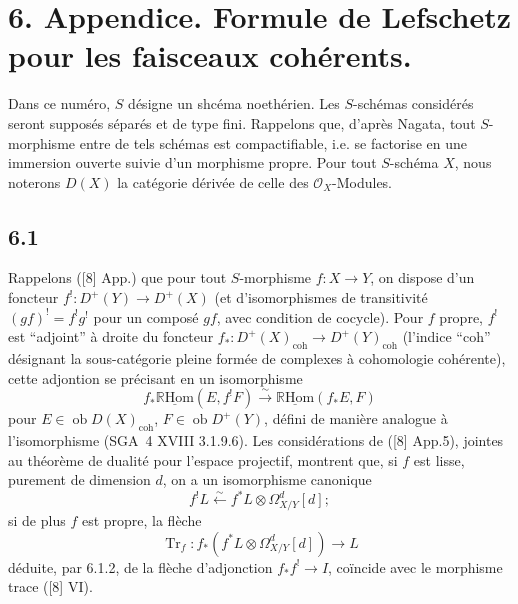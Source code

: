 \documentclass[11pt]{article}
\providecommand{\cO}{\mathcal{O}}
\newcommand{\R}{\mathbb{R}}\newcommand{\RHomCore}{\mathbb{R}\mathrm{Hom}}
\providecommand{\RHom}{\RHomCore}
\providecommand{\uRHom}{\underline{\RHom}}
\providecommand{\RHom}{\RHomCore}
\providecommand{\RHom}{\R\mathcal{H}om}
\providecommand{\R}{\mathrm R}
\providecommand{\RHom}{\RHomCore}
\begin{document}
\section*{6. Appendice. Formule de Lefschetz pour les faisceaux cohérents.}

Dans ce numéro, $S$ désigne un shcéma noethérien. Les $S$-schémas considérés seront supposés séparés et de type fini. Rappelons que, d'après Nagata, tout $S$-morphisme entre de tels schémas est compactifiable, i.e. se factorise en une immersion ouverte suivie d'un morphisme propre. Pour tout $S$-schéma $X$, nous noterons $D(X)$ la catégorie dérivée de celle des $\cO_X$-Modules.

\subsection*{6.1}
Rappelons ([8] App.) que pour tout $S$-morphisme $f:X\to Y$, on dispose d'un foncteur $f^!:D^+(Y)\longrightarrow D^+(X)$ (et d'isomorphismes de transitivité $(gf)^! = f^!g^!$ pour un composé $gf$, avec condition de cocycle). Pour $f$ propre, $f^!$ est ``adjoint'' à droite du foncteur $f_*:D^+(X)_{\mathrm{coh}}\to D^+(Y)_{\mathrm{coh}}$ (l'indice ``coh'' désignant la sous-catégorie pleine formée de complexes à cohomologie cohérente), cette adjontion se précisant en un isomorphisme
\begin{equation}
\tag{6.1.1}
f_*\uRHom(E,f^!F)\xrightarrow{\sim}\uRHom(f_*E,F)
\end{equation}
pour $E\in\operatorname{ob}D(X)_{\mathrm{coh}}$, $F\in\operatorname{ob}D^+(Y)$, défini de manière analogue à l'isomorphisme (SGA~4 XVIII 3.1.9.6). Les considérations de ([8] App.5), jointes au théorème de dualité pour l'espace projectif, montrent que, si $f$ est lisse, purement de dimension $d$, on a un isomorphisme canonique
\begin{equation}
\tag{6.1.2}
f^!L\xleftarrow{\sim} f^*L\otimes\Omega^d_{X/Y}[d];
\end{equation}
si de plus $f$ est propre, la flèche
\begin{equation}
\tag{6.1.3}
\operatorname{Tr}_f:f_*(f^*L\otimes\Omega^d_{X/Y}[d])\longrightarrow L
\end{equation}
déduite, par 6.1.2, de la flèche d'adjonction $f_*f^!\to I$, coïncide avec le morphisme trace ([8] VI).
\end{document}
